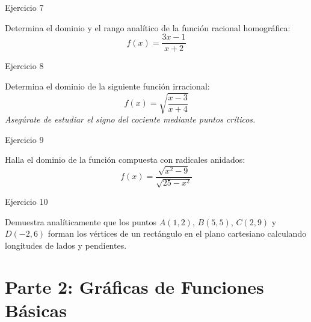 \documentclass[aspectratio=169]{beamer}
\begin{document}
\begin{frame}{Ejercicio 7}
  \begin{mwejercicio}
    Determina el dominio y el rango analítico de la función racional homográfica:
    $$f(x) = \frac{3x - 1}{x + 2}$$
  \end{mwejercicio}
  \vspace{3.5cm}
\end{frame}
\begin{frame}{Ejercicio 8}
  \begin{mwejercicio}
    Determina el dominio de la siguiente función irracional:
    $$f(x) = \sqrt{\frac{x - 3}{x + 4}}$$
    \emph{Asegúrate de estudiar el signo del cociente mediante puntos críticos.}
  \end{mwejercicio}
  \vspace{3.5cm}
\end{frame}
\begin{frame}{Ejercicio 9}
  \begin{mwejercicio}
    Halla el dominio de la función compuesta con radicales anidados:
    $$f(x) = \frac{\sqrt{x^2 - 9}}{\sqrt{25 - x^2}}$$
  \end{mwejercicio}
  \vspace{3.5cm}
\end{frame}
\begin{frame}{Ejercicio 10}
  \begin{mwejercicio}
    Demuestra analíticamente que los puntos $A(1, 2)$, $B(5, 5)$, $C(2, 9)$ y $D(-2, 6)$ forman los vértices de un rectángulo en el plano cartesiano calculando longitudes de lados y pendientes.
  \end{mwejercicio}
  \vspace{3.5cm}
\end{frame}


\section{Parte 2: Gráficas de Funciones Básicas}
\end{document}
